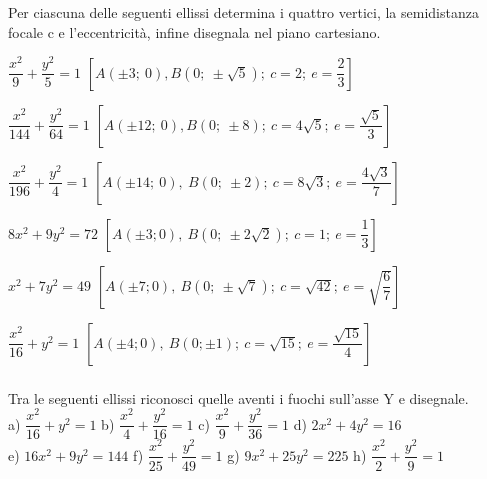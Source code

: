 \begin{esercizio}
  \label{ese:div.003}
  Per ciascuna delle seguenti ellissi determina i quattro vertici, la 
semidistanza focale c e l'eccentricità, infine disegnala nel piano 
cartesiano.
  \begin{enumeratea}
\item \( \dfrac{x^{2}}{9} + \dfrac{y^{2}}{5} =1\)  
\hfill \(\left[A(\pm3;~0), B\left(0; ~ \pm  \sqrt{5} \right); ~c=2 ;~ e= 
\dfrac{2}{3} \right]\)
\item \( \dfrac{x^{2}}{144} + \dfrac{y^{2}}{64} =1\)  
\hfill \(\left[A(\pm12;~ 0), B(0; ~ \pm 8); ~c=4 \sqrt{5}  ;~ e= 
\dfrac{\sqrt{5}}{3} \right]\)

\item \( \dfrac{x^{2}}{196} + \dfrac{y^{2}}{4} =1\)
\hfill \(\left[A(\pm14;~ 0),~ B(0; ~ \pm 2);~ c=8 \sqrt{3}  ;~ e= 
\dfrac{4\sqrt{3}}{7} \right]\)

\item \(8{x^{2}}+9{y^{2}}=72\)
\hfill  \(\left[A(\pm3; 0),~ B\left(0;~ \pm 2 \sqrt{2} \right);~c=1; ~e= 
\dfrac{1}{3} \right]\)

\item \({x^{2}}+7{y^{2}}=49\)
\hfill \(\left[A(\pm7; 0),~ B\left(0; ~ \pm  \sqrt{7} \right);~ c= \sqrt{42} 
;~ e= \sqrt{\dfrac{6}{7}} \right]\)

\item \( \dfrac{x^{2}}{16} + y^{2} =1\)  
\hfill \(\left[A(\pm4; 0),~ B(0;  \pm 1);~ c= \sqrt{15}  ;~ e= 
\dfrac{\sqrt{15}}{4} \right]\)

  \end{enumeratea}
\end{esercizio}

\subsubsection*{}

\begin{esercizio}
  \label{ese:div.003}
   Tra le seguenti ellissi riconosci quelle aventi i fuochi sull'asse 
Y e disegnale. \\
a) \( \dfrac{x^{2}}{16} + y^{2} =1\)  \hspace{1.5cm} b) \( \dfrac{x^{2}}{4} + 
\dfrac{y^{2}}{16} =1\)\hspace{1.5cm}  c) \( \dfrac{x^{2}}{9} + 
\dfrac{y^{2}}{36} =1\)\hspace{1.45cm} d) \(2 x^{2} +4y^{2} =16\)\\
e) \(16 x^{2} +9 y^{2} =144\)  \hspace{0.7cm} f) \( \dfrac{x^{2}}{25} + 
\dfrac{y^{2}}{49} =1\)\hspace{1.6cm}  g) \(9 x^{2} +25 y^{2} =225\) 
\hspace{0.6cm} h) \( \dfrac{x^{2}}{2} + \dfrac{y^{2}}{9} =1\) 
\end{esercizio}

